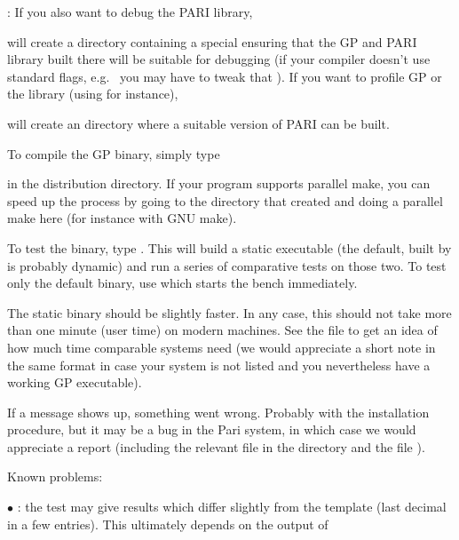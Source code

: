 : If you also want to debug the PARI library,


\noindent will create a directory  containing a special
 ensuring that the GP and PARI library built there will be
suitable for debugging (if your compiler doesn't use standard flags,
e.g.~ you may have to tweak that ). If you want to
profile GP or the library (using  for instance), 


\noindent will create an  directory where a suitable version
of PARI can be built.

 To compile the GP binary, simply type


\noindent in the distribution directory. If your  program supports
parallel make, you can speed up the process by going to the 
directory that  created and doing a parallel make here (for
instance  with GNU make).


To test the binary, type . This will build a static
executable (the default, built by  is probably dynamic) and
run a series of comparative tests on those two. To test only the default
binary, use  which starts the bench immediately.

The static binary should be slightly faster. In any case, this should not
take more than one minute (user time) on modern machines. See the file
 to get an idea of how much time comparable systems need (we
would appreciate a short note in the same format in case your system is not
listed and you nevertheless have a working GP executable).

If a \kbd{[BUG]} message shows up, something went wrong. Probably with the
installation procedure, but it may be a bug in the Pari system, in which
case we would appreciate a report (including the relevant  file
in the  directory and the file ).

\noindent Known problems:

$\bullet$ : the test 
may give results which differ slightly from the template (last decimal in a
few entries). This ultimately depends on the output of

